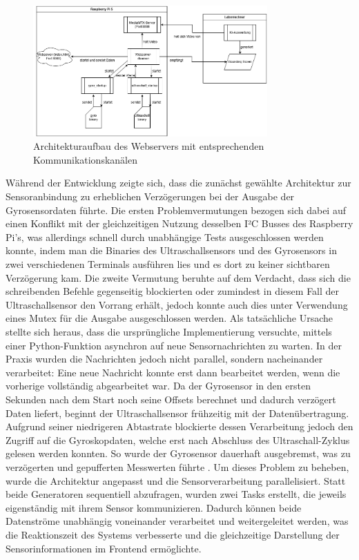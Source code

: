 \begin{figure}[H]
    \begin{center}
        \includegraphics[width=0.8\textwidth]{images/Architekturaufbau_webserver.png}
        \caption{Architekturaufbau des Webservers mit entsprechenden Kommunikationskanälen}
        \label{fig:webserver_architektur}
    \end{center}
\end{figure}

Während der Entwicklung zeigte sich, dass die zunächst gewählte Architektur zur Sensoranbindung zu erheblichen Verzögerungen bei der Ausgabe der Gyrosensordaten führte. Die ersten Problemvermutungen bezogen sich dabei auf einen Konflikt mit der gleichzeitigen Nutzung desselben I²C Busses des Raspberry Pi's, was allerdings schnell durch unabhängige Tests ausgeschlossen werden konnte, indem man die Binaries des Ultraschallsensors und des Gyrosensors in zwei verschiedenen Terminals ausführen lies und es dort zu keiner sichtbaren Verzögerung kam.
Die zweite Vermutung beruhte auf dem Verdacht, dass sich die schreibenden Befehle gegenseitig blockierten oder zumindest in diesem Fall der Ultraschallsensor den Vorrang erhält, jedoch konnte auch dies unter Verwendung eines Mutex für die Ausgabe ausgeschlossen werden.
Als tatsächliche Ursache stellte sich heraus, dass die ursprüngliche Implementierung versuchte, mittels einer Python-Funktion asynchron auf neue Sensornachrichten zu warten. In der Praxis wurden die Nachrichten jedoch nicht parallel, sondern nacheinander verarbeitet: Eine neue Nachricht konnte erst dann bearbeitet werden, wenn die vorherige vollständig abgearbeitet war. Da der Gyrosensor in den ersten Sekunden nach dem Start noch seine Offsets berechnet und dadurch verzögert Daten liefert, beginnt der Ultraschallsensor frühzeitig mit der Datenübertragung. 
Aufgrund seiner niedrigeren Abtastrate blockierte dessen Verarbeitung jedoch den Zugriff auf die Gyroskopdaten, welche erst nach Abschluss des Ultraschall-Zyklus gelesen werden konnten. So wurde der Gyrosensor dauerhaft ausgebremst, was zu verzögerten und gepufferten Messwerten führte \cite{webserver_python_anext}.
Um dieses Problem zu beheben, wurde die Architektur angepasst und die Sensorverarbeitung parallelisiert. Statt beide Generatoren sequentiell abzufragen, wurden zwei Tasks erstellt, die jeweils eigenständig mit ihrem Sensor kommunizieren. Dadurch können beide Datenströme unabhängig voneinander verarbeitet und weitergeleitet werden, was die Reaktionszeit des Systems verbesserte und die gleichzeitige Darstellung der Sensorinformationen im Frontend ermöglichte.


